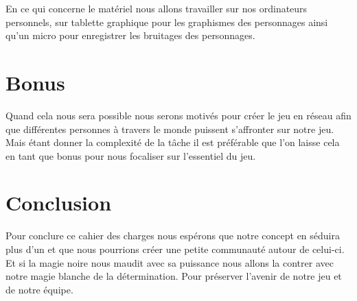 \documentclass[12pt]{extarticle}
\begin{document}
En ce qui concerne le matériel nous allons travailler sur nos ordinateurs personnels, sur tablette graphique pour les graphismes des personnages ainsi qu'un micro pour enregistrer les bruitages des personnages.

\newpage

\section{Bonus}

Quand cela nous sera possible nous serons motivés pour créer le jeu en réseau afin que différentes personnes à travers le monde puissent s’affronter sur notre jeu. Mais étant donner la complexité de la tâche il est préférable que l’on laisse cela en tant que bonus pour nous focaliser sur l’essentiel du jeu.

\section{Conclusion}

Pour conclure ce cahier des charges nous espérons que notre concept en séduira plus d’un et que nous pourrions créer une petite communauté autour de celui-ci. Et si la magie noire nous maudit avec sa puissance nous allons la contrer avec notre magie blanche de la détermination. Pour préserver l’avenir de notre jeu et de notre équipe.
\end{document}
